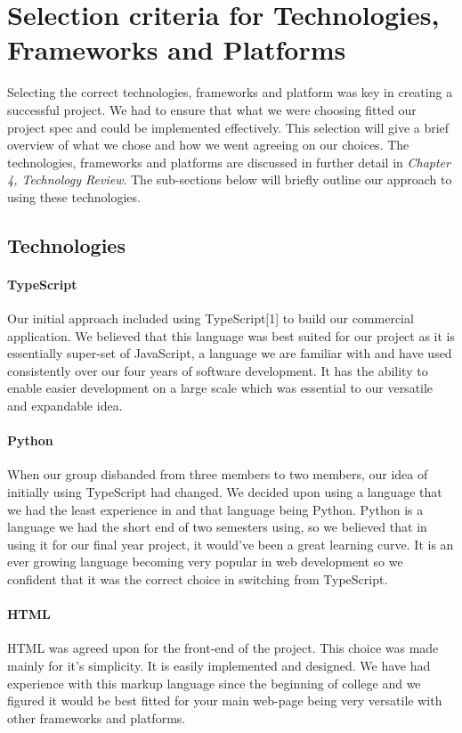 \section{Selection criteria for Technologies, Frameworks and Platforms}
Selecting the correct technologies, frameworks and platform was key in creating a successful project. We had to ensure that what we were choosing fitted our project spec and could be implemented effectively. This selection will give a brief overview of what we chose and how we went agreeing on our choices. The technologies, frameworks and platforms are discussed in further detail in \textit{Chapter 4, Technology Review}. The sub-sections below will briefly outline our approach to using these technologies.
\subsection{Technologies}
\paragraph{TypeScript}
Our initial approach included using TypeScript[1] to build our commercial application. We believed that this language was best suited for our project as it is essentially super-set of JavaScript, a language we are familiar with and have used consistently over our four years of software development. It has the ability to enable easier development on a large scale which was essential to our versatile and expandable idea\cite{bierman_abadi_torgersen_2014}.

\paragraph{Python}
When our group disbanded from three members to two members, our idea of initially using TypeScript had changed. We decided upon using a language that we had the least experience in and that language being Python. Python is a language we had the short end of two semesters using, so we believed that in using it for our final year project, it would've been a great learning curve. It is an ever growing language becoming very popular in web development so we confident that it was the correct choice in switching from TypeScript.
\newpage
\paragraph{HTML}
HTML was agreed upon for the front-end of the project. This choice was made mainly for it's simplicity. It is easily implemented and designed. We have had experience with this markup language since the beginning of college and we figured it would be best fitted for your main web-page being very versatile with other frameworks and platforms.

